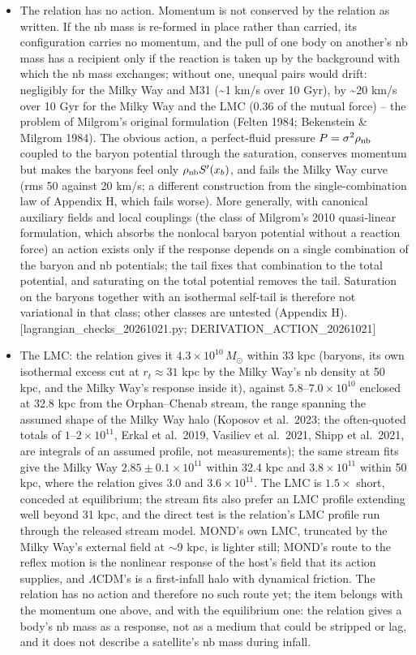 \documentclass[
  10pt,
]{article}
\begin{document}
\begin{itemize}
\item The relation has no action. Momentum is not conserved by the relation as written. If the nb mass is re-formed in place rather than carried, its configuration carries no momentum, and the pull of one body on another's nb mass has a recipient only if the reaction is taken up by the background with which the nb mass exchanges; without one, unequal pairs would drift: negligibly for the Milky Way and M31 (\textasciitilde{}1 km/s over 10 Gyr), by \textasciitilde{}20 km/s over 10 Gyr for the Milky Way and the LMC (0.36 of the mutual force) -- the problem of Milgrom's original formulation (Felten 1984; Bekenstein \& Milgrom 1984). The obvious action, a perfect-fluid pressure $P=\sigma^2\rho_{\rm nb}$ coupled to the baryon potential through the saturation, conserves momentum but makes the baryons feel only $\rho_{\rm nb}S'(x_b)$, and fails the Milky Way curve (rms 50 against 20 km/s; a different construction from the single-combination law of Appendix H, which fails worse). More generally, with canonical auxiliary fields and local couplings (the class of Milgrom's 2010 quasi-linear formulation, which absorbs the nonlocal baryon potential without a reaction force) an action exists only if the response depends on a single combination of the baryon and nb potentials; the tail fixes that combination to the total potential, and saturating on the total potential removes the tail. Saturation on the baryons together with an isothermal self-tail is therefore not variational in that class; other classes are untested (Appendix H). {[}lagrangian\_checks\_20261021.py; DERIVATION\_ACTION\_20261021{]}
\item The LMC: the relation gives it $4.3\times10^{10}\,M_\odot$ within 33 kpc (baryons, its own isothermal excess cut at $r_t\approx31$ kpc by the Milky Way's nb density at 50 kpc, and the Milky Way's response inside it), against $5.8$--$7.0\times10^{10}$ enclosed at 32.8 kpc from the Orphan--Chenab stream, the range spanning the assumed shape of the Milky Way halo (Koposov et al.~2023; the often-quoted totals of $1$--$2\times10^{11}$, Erkal et al.~2019, Vasiliev et al.~2021, Shipp et al.~2021, are integrals of an assumed profile, not measurements); the same stream fits give the Milky Way $2.85\pm0.1\times10^{11}$ within 32.4 kpc and $3.8\times10^{11}$ within 50 kpc, where the relation gives $3.0$ and $3.6\times10^{11}$. The LMC is $1.5\times$ short, conceded at equilibrium; the stream fits also prefer an LMC profile extending well beyond 31 kpc, and the direct test is the relation's LMC profile run through the released stream model. MOND's own LMC, truncated by the Milky Way's external field at $\sim$9 kpc, is lighter still; MOND's route to the reflex motion is the nonlinear response of the host's field that its action supplies, and $\Lambda$CDM's is a first-infall halo with dynamical friction. The relation has no action and therefore no such route yet; the item belongs with the momentum one above, and with the equilibrium one: the relation gives a body's nb mass as a response, not as a medium that could be stripped or lag, and it does not describe a satellite's nb mass during infall.

\end{itemize}
\end{document}
